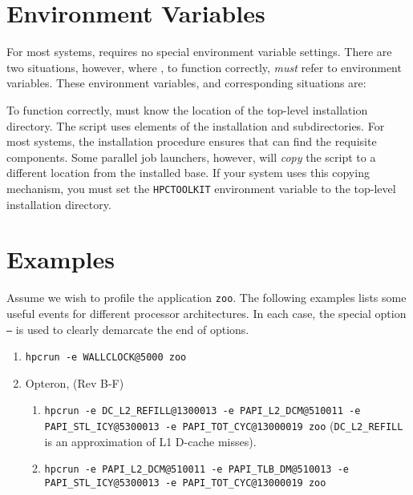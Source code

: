 \documentclass[english]{article}
\begin{document}

\section{Environment Variables}
For most systems,  requires no special environment variable settings.
There are two situations, however, where , to function correctly,
\emph{must} refer to environment variables. These environment variables, and
corresponding situations are:
\begin{Description}
  \item[\verb+HPCTOOLKIT+] To function correctly,  must know
       the location of the  top-level installation directory.
       The  script uses elements of the installation  and
        subdirectories. For most systems, the 
       installation procedure ensures that  can find the requisite
       components. Some parallel job launchers, however, will \emph{copy} the
        script to a different location from the installed base. If your
       system uses this copying mechanism, you must set the \verb+HPCTOOLKIT+
       environment variable to the top-level installation directory.
\end{Description}


\section{Examples}

Assume we wish to profile the application \texttt{zoo}.
The following examples lists some useful events for different processor architectures.
In each case, the special option \texttt{--} is used to clearly demarcate the end of  options.

\begin{enumerate}
\item \verb+hpcrun -e WALLCLOCK@5000 zoo+

\item Opteron, (Rev B-F)
  \begin{enumerate}
    \item \verb+hpcrun -e DC_L2_REFILL@1300013 -e PAPI_L2_DCM@510011 -e PAPI_STL_ICY@5300013 -e PAPI_TOT_CYC@13000019 zoo+ (\verb+DC_L2_REFILL+ is an approximation of L1 D-cache misses).
    \item \verb+hpcrun -e PAPI_L2_DCM@510011 -e PAPI_TLB_DM@510013 -e PAPI_STL_ICY@5300013 -e PAPI_TOT_CYC@13000019 zoo+
  \end{enumerate}

\end{enumerate}
\end{document}
